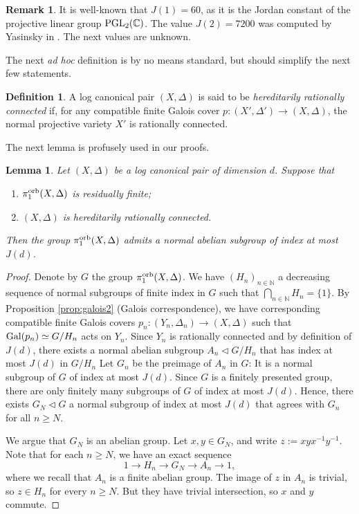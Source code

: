 \documentclass{amsart}
\newcommand{\nn}{\mathbb{N}}
\newcommand{\cc}{\mathbb{C}}
\newtheorem{lemma}[theorem]{Lemma}
\theoremstyle{definition}
\newtheorem{definition}[theorem]{Definition}
\newtheorem{remark}[theorem]{Remark}
\theoremstyle{remark}
\numberwithin{equation}{section}
\begin{document}
\begin{remark}\label{rem:jordan-values}
    It is well-known that $J(1)=60$, as it is the Jordan constant of the projective linear group ${\rm PGL}_2(\cc)$. The value $J(2)=7200$ was computed by Yasinsky in \cite[Theorem 1.9]{Yas19}. The next values are unknown.
\end{remark}

The next {\it ad hoc} definition is by no means standard, but should simplify the next few statements.

\begin{definition}
    A log canonical pair $(X,\Delta)$ is said to be {\it hereditarily rationally connected} if, for any compatible finite Galois cover $p:(X',\Delta')\to (X,\Delta)$, the normal projective variety $X'$ is rationally connected. 
\end{definition}

The next lemma is profusely used in our proofs.

\begin{lemma}\label{lem:res-finite}
Let $(X,\Delta)$ be a log canonical pair of dimension $d$. Suppose that
\begin{enumerate}
    \item $\pi_1^{\rm orb}(X,\Delta)$ is residually finite;
    \item $(X,\Delta)$ is hereditarily rationally connected. 
\end{enumerate}
Then the group $\pi_1^{\rm orb}(X,\Delta)$ admits a normal abelian subgroup of index at most $J(d)$.
\end{lemma}

\begin{proof}
Denote by $G$ the group $\pi_1^{\rm orb}(X,\Delta)$. We have $(H_n)_{n\in \nn}$ a decreasing sequence of normal subgroups of finite index in $G$ such that $\bigcap_{n\in \nn} H_n =\{1\}$. By Proposition \ref{prop:galois2} (Galois correspondence), we have corresponding compatible finite Galois covers $p_n:(Y_n,\Delta_n)\to (X,\Delta)$ such that ${\rm Gal}(p_n)\simeq G/H_n$ acts on $Y_n$.
Since $Y_n$ is rationally connected and by definition of $J(d)$, there exists a normal abelian subgroup
$A_n \triangleleft G/H_n$ that has index at most $J(d)$ in $G/H_n$
Let $G_n$ be the preimage of $A_n$ in $G$: It is a normal subgroup of $G$ of index at most $J(d)$.
Since $G$ is a finitely presented group, there are only finitely many subgroups of $G$ of index at most $J(d)$.
Hence, there exists $G_N\triangleleft G$ a normal subgroup of index at most $J(d)$
that agrees with $G_n$ for all $n\ge N$.

We argue that $G_N$ is an abelian group. 
Let $x,y\in G_N$, and write $z:=xyx^{-1}y^{-1}$. Note that for each $n\ge N$, we have an exact sequence
\begin{equation}\label{eq:amses}
1\rightarrow H_n \rightarrow G_N \rightarrow A_n \rightarrow 1,     
\end{equation}
where we recall that $A_n$ is a finite abelian group.
The image of $z$ in $A_n$ is trivial, so $z\in H_n$ for every $n\ge N$.
But they have trivial intersection, so $x$ and $y$ commute.
\end{proof}
\end{document}
